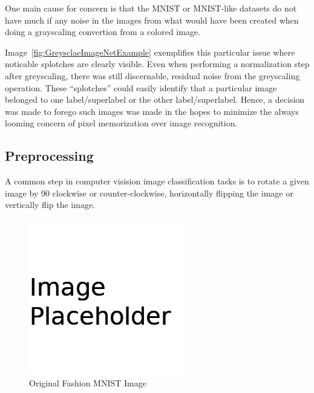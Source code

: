 \documentclass[conference]{IEEEtran}
\begin{document}
One main cause for concern is that the MNIST or MNIST-like datasets do not have
much if any noise in the images from what would have been created when doing a
grayscaling convertion from a colored image.

Image~\ref{fig:GreysclaeImageNetExample} exemplifies this particular issue where
noticable splotches are clearly visible. Even when performing a normalization
step after greyscaling, there was still discernable, residual noise from the
greyscaling operation. These ``splotches'' could easily identify that a
particular image belonged to one label/superlabel or the other label/superlabel.
Hence, a decision was made to forego such images was made in the hopes to
minimize the always looming concern of pixel memorization over image
recognition.




\subsection{Preprocessing}

A common step in computer visision image classification tasks is to rotate a
given image by 90\textdegree{} clockwise or counter-clockwise, horizontally
flipping the image or vertically flip the image.


\begin{figure}[H]
  \centering
  \includegraphics[width=0.8\linewidth]{figures/placeholder.png}
  \caption{Original Fashion MNIST Image~\cite{fashion_mnist}}%
  \label{fig:FashionMNIST-OriginalImage}
\end{figure}
\end{document}

